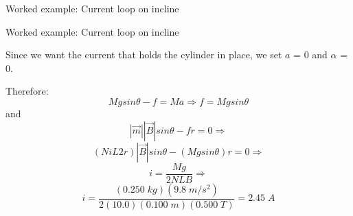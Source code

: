 {\begin{frame}{Worked example: Current loop on incline}
\end{frame}

%
%
%

\begin{frame}{Worked example: Current loop on incline}

  Since we want the current that holds the cylinder in place,
  we set $a$ = 0 and $\alpha$ = 0.\\

  \vspace{0.2cm}

  Therefore:
  \begin{equation*}
  	M g sin\theta - f = M a \Rightarrow f = M g sin\theta
  \end{equation*}
  and
  \begin{equation*}
  	|\vec{m}| |\vec{B}| sin\theta - f r = 0 \Rightarrow
  \end{equation*}
  \begin{equation*}
  	( N i L 2r ) |\vec{B}| sin\theta - ( M g sin\theta ) r = 0 \Rightarrow
  \end{equation*}
  \begin{equation*}
  	i = \frac{Mg}{2NLB} \Rightarrow
  \end{equation*}
  \begin{equation*}
  	i = \frac{(0.250 \; kg)(9.8 \; m/s^2)}{2(10.0)(0.100 \; m)(0.500 \; T)} = 2.45 \; A
  \end{equation*}

\end{frame}

} %


%
%

